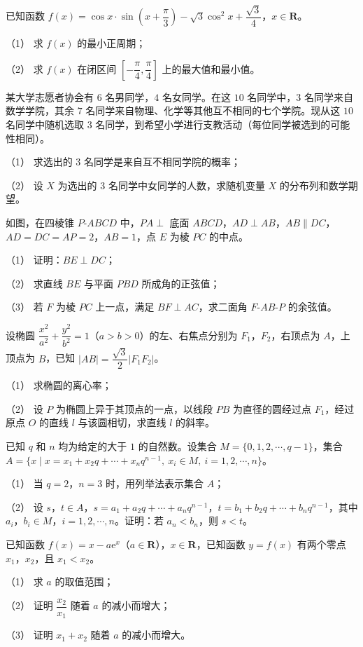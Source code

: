 \begin{question}
已知函数 $f(x)=\cos x\cdot\sin\left(x+\dfrac\pi3\right)-\sqrt3\cos^2x+\dfrac{\sqrt3}{4}$，$x\in\mathbf R$。

（1） 求 $f(x)$ 的最小正周期；

（2） 求 $f(x)$ 在闭区间 $\left[-\dfrac\pi4,\dfrac\pi4\right]$ 上的最大值和最小值。

\end{question}
\begin{question}
某大学志愿者协会有 $6$ 名男同学，$4$ 名女同学。在这 $10$ 名同学中，$3$ 名同学来自数学学院，其余 $7$ 名同学来自物理、化学等其他互不相同的七个学院。现从这 $10$ 名同学中随机选取 $3$ 名同学，到希望小学进行支教活动（每位同学被选到的可能性相同）。

（1） 求选出的 $3$ 名同学是来自互不相同学院的概率；

（2） 设 $X$ 为选出的 $3$ 名同学中女同学的人数，求随机变量 $X$ 的分布列和数学期望。

\Needspace{0.4\textheight}
\end{question}
\begin{question}
如图，在四棱锥 $P\text{-}ABCD$ 中，$PA\perp$ 底面 $ABCD$，$AD\perp AB$，$AB\parallel DC$，$AD=DC=AP=2$，$AB=1$，点 $E$ 为棱 $PC$ 的中点。
\nopagebreak[4]
\begin{center}\end{center}
\nopagebreak[4]
（1） 证明：$BE\perp DC$；

（2） 求直线 $BE$ 与平面 $PBD$ 所成角的正弦值；

（3） 若 $F$ 为棱 $PC$ 上一点，满足 $BF\perp AC$，求二面角 $F\text{-}AB\text{-}P$ 的余弦值。

\end{question}
\begin{question}
设椭圆 $\dfrac{x^2}{a^2}+\dfrac{y^2}{b^2}=1$（$a>b>0$）的左、右焦点分别为 $F_1$，$F_2$，右顶点为 $A$，上顶点为 $B$，已知 $|AB|=\dfrac{\sqrt3}{2}|F_1F_2|$。

（1） 求椭圆的离心率；

（2） 设 $P$ 为椭圆上异于其顶点的一点，以线段 $PB$ 为直径的圆经过点 $F_1$，经过原点 $O$ 的直线 $l$ 与该圆相切，求直线 $l$ 的斜率。

\end{question}
\begin{question}
已知 $q$ 和 $n$ 均为给定的大于 $1$ 的自然数。设集合 $M=\{0,1,2,\cdots,q-1\}$，集合 $A=\{x\mid x=x_1+x_2q+\cdots+x_nq^{n-1},\ x_i\in M,\ i=1,2,\cdots,n\}$。

（1） 当 $q=2$，$n=3$ 时，用列举法表示集合 $A$；

（2） 设 $s$，$t\in A$，$s=a_1+a_2q+\cdots+a_nq^{n-1}$，$t=b_1+b_2q+\cdots+b_nq^{n-1}$，其中 $a_i$，$b_i\in M$，$i=1,2,\cdots,n$。证明：若 $a_n<b_n$，则 $s<t$。

\end{question}
\begin{question}
已知函数 $f(x)=x-a\mathrm e^x$（$a\in\mathbf R$），$x\in\mathbf R$，已知函数 $y=f(x)$ 有两个零点 $x_1$，$x_2$，且 $x_1<x_2$。

（1） 求 $a$ 的取值范围；

（2） 证明 $\dfrac{x_2}{x_1}$ 随着 $a$ 的减小而增大；

（3） 证明 $x_1+x_2$ 随着 $a$ 的减小而增大。

\end{question}